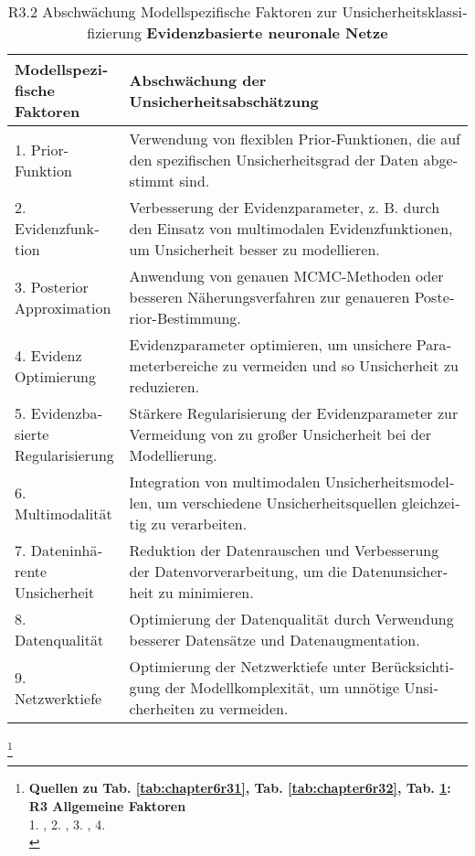 \begin{otherlanguage}{ngerman}
\begin{table}[!htpb]
  \centering
  \footnotesize
  \begin{tabularx}{\textwidth}{|l|X|}
    \hline
    \textbf{Modellspezifische Faktoren} & \textbf{Abschwächung der Unsicherheitsabschätzung} \\
    \hline
    1. Prior-Funktion & Verwendung von flexiblen Prior-Funktionen, die auf den spezifischen Unsicherheitsgrad der Daten abgestimmt sind. \\
    \hline
    2. Evidenzfunktion & Verbesserung der Evidenzparameter, z. B. durch den Einsatz von multimodalen Evidenzfunktionen, um Unsicherheit besser zu modellieren. \\
    \hline
    3. Posterior Approximation & Anwendung von genauen MCMC-Methoden oder besseren Näherungsverfahren zur genaueren Posterior-Bestimmung. \\
    \hline
    4. Evidenz Optimierung & Evidenzparameter optimieren, um unsichere Parameterbereiche zu vermeiden und so Unsicherheit zu reduzieren. \\
    \hline
    5. Evidenzbasierte Regularisierung & Stärkere Regularisierung der Evidenzparameter zur Vermeidung von zu großer Unsicherheit bei der Modellierung. \\
    \hline
    6. Multimodalität & Integration von multimodalen Unsicherheitsmodellen, um verschiedene Unsicherheitsquellen gleichzeitig zu verarbeiten. \\
    \hline
    7. Dateninhärente Unsicherheit & Reduktion der Datenrauschen und Verbesserung der Datenvorverarbeitung, um die Datenunsicherheit zu minimieren. \\
    \hline
    8. Datenqualität & Optimierung der Datenqualität durch Verwendung besserer Datensätze und Datenaugmentation. \\
    \hline
    9. Netzwerktiefe & Optimierung der Netzwerktiefe unter Berücksichtigung der Modellkomplexität, um unnötige Unsicherheiten zu vermeiden. \\
    \hline
  \end{tabularx}
  \caption{R3.2 Abschwächung Modellspezifische Faktoren zur Unsicherheitsklassifizierung \textbf{\gls{Evidenzbasierte neuronale Netze}}}\label{tab:chapter6r33}
\end{table}

\footnote{%
\begin{minipage}[t]{\textwidth}
\scriptsize
\textbf{Quellen zu Tab. \ref{tab:chapter6r31}, Tab. \ref{tab:chapter6r32}, Tab. \ref{tab:chapter6r33}:}\\[0.125em]
\textbf{R3 Allgemeine Faktoren}\\
1. \parencite[S.~47–52]{AndreasKreutz2022},
2. \parencite[S.~6–9]{perdikaris2017nonlinear},
3. \parencite[S.~3]{ovadia2019can},
4. \parencite[S.~60]{AndreasKreutz2022} \\[0.125em]


\end{minipage}}
\end{otherlanguage}
